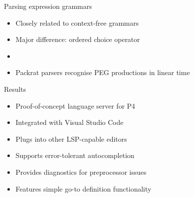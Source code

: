 \documentclass[aspectratio=169]{beamer}
\begin{document}
\begin{frame}{Parsing expression grammars}
	\begin{itemize}
		\item Closely related to context-free grammars \pause
		\item Major difference: \alert{ordered choice} operator \pause
		\item {} \pause
		\item Packrat parsers recognise PEG productions in linear time
	\end{itemize}
\end{frame}

\begin{frame}{Results}
	\begin{itemize}
		\item Proof-of-concept language server for P4 \pause
		\item Integrated with Visual Studio Code \pause
		\item Plugs into other LSP-capable editors \pause
		\item Supports \alert{error-tolerant autocompletion} \pause
		\item Provides diagnostics for preprocessor issues \pause
		\item Features simple go-to definition functionality
	\end{itemize}
\end{frame}
\end{document}
